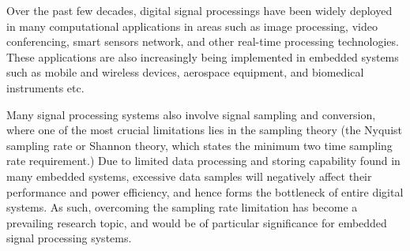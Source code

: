 Over the past few decades, digital signal processings have been widely deployed in many computational applications in areas such as image processing, video conferencing, smart sensors network, and other real-time processing technologies. These applications are also increasingly being implemented in embedded systems such as mobile and wireless devices, aerospace equipment, and biomedical instruments etc. 

Many signal processing systems also involve signal sampling and conversion, where one of the most crucial limitations lies in the sampling theory (the Nyquist sampling rate or Shannon theory, which states the minimum two time sampling rate requirement.) Due to limited data processing and storing capability found in many embedded systems, excessive data samples will negatively affect their performance and power efficiency, and hence forms the bottleneck of entire digital systems. As such, overcoming the sampling rate limitation has become a prevailing research topic, and would be of particular significance for embedded signal processing systems. 


